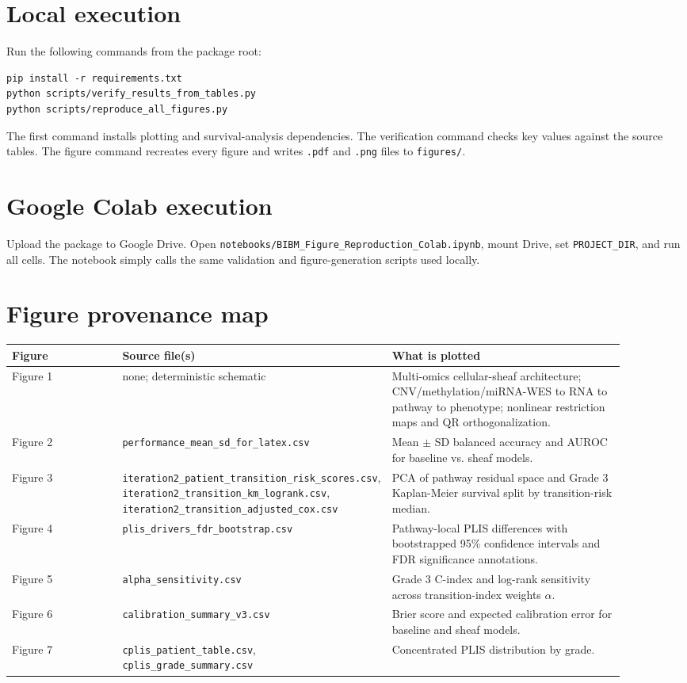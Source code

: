 \documentclass[11pt]{article}
\begin{document}
\section{Local execution}
Run the following commands from the package root:
\begin{lstlisting}
pip install -r requirements.txt
python scripts/verify_results_from_tables.py
python scripts/reproduce_all_figures.py
\end{lstlisting}
The first command installs plotting and survival-analysis dependencies. The verification command checks key values against the source tables. The figure command recreates every figure and writes \texttt{.pdf} and \texttt{.png} files to \texttt{figures/}.

\section{Google Colab execution}
Upload the package to Google Drive. Open \texttt{notebooks/BIBM\_Figure\_Reproduction\_Colab.ipynb}, mount Drive, set \texttt{PROJECT\_DIR}, and run all cells. The notebook simply calls the same validation and figure-generation scripts used locally.

\section{Figure provenance map}
\begin{longtable}{p{0.18\linewidth}p{0.34\linewidth}p{0.38\linewidth}}
\toprule
Figure & Source file(s) & What is plotted \\
\midrule
Figure 1 & none; deterministic schematic & Multi-omics cellular-sheaf architecture; CNV/methylation/miRNA-WES to RNA to pathway to phenotype; nonlinear restriction maps and QR orthogonalization. \\
Figure 2 & \texttt{performance\_mean\_sd\_for\_latex.csv} & Mean $\pm$ SD balanced accuracy and AUROC for baseline vs. sheaf models. \\
Figure 3 & \texttt{iteration2\_patient\_transition\_risk\_scores.csv}, \texttt{iteration2\_transition\_km\_logrank.csv}, \texttt{iteration2\_transition\_adjusted\_cox.csv} & PCA of pathway residual space and Grade 3 Kaplan-Meier survival split by transition-risk median. \\
Figure 4 & \texttt{plis\_drivers\_fdr\_bootstrap.csv} & Pathway-local PLIS differences with bootstrapped 95\% confidence intervals and FDR significance annotations. \\
Figure 5 & \texttt{alpha\_sensitivity.csv} & Grade 3 C-index and log-rank sensitivity across transition-index weights $\alpha$. \\
Figure 6 & \texttt{calibration\_summary\_v3.csv} & Brier score and expected calibration error for baseline and sheaf models. \\
Figure 7 & \texttt{cplis\_patient\_table.csv}, \texttt{cplis\_grade\_summary.csv} & Concentrated PLIS distribution by grade. \\
\bottomrule
\end{longtable}
\end{document}
